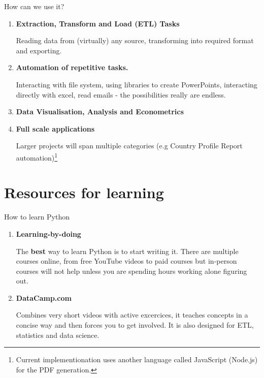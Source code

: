 \documentclass[aspectratio=169]{beamer}
\begin{document}
\begin{frame}{How can we use it?}

\begin{enumerate}
	\item \textbf{Extraction, Transform and Load (ETL) Tasks}

			Reading data from (virtually) any source, transforming into required format and exporting.
	
	\item \textbf{Automation of repetitive tasks.}
	
			Interacting with file system, using libraries to create PowerPoints, interacting directly with excel, read emails - the possibilities really are endless.
			
	\item \textbf{Data Visualisation, Analysis and Econometrics}
	
	\item \textbf{Full scale applications}
		
			Larger projects will span multiple categories (e.g Country Profile Report automation)\footnote{Current implementionation uses another language called JavaScript (Node.js) for the PDF generation.}
	
\end{enumerate}
	
\end{frame}

\section{Resources for learning}

\begin{frame}{How to learn Python}

\begin{enumerate}

\item \textbf{Learning-by-doing}

		The \textbf{best} way to learn Python is to start writing it. There are multiple courses online, from free YouTube videos to paid courses but in-person courses will not help unless you are spending hours working alone figuring out.
		
\item \textbf{DataCamp.com}
	
		Combines very short videos with active excercices, it teaches concepts in a concise way and then forces you to get involved. It is also designed for ETL, statistics and data science. 
	
\end{enumerate}
\end{frame}
\end{document}
